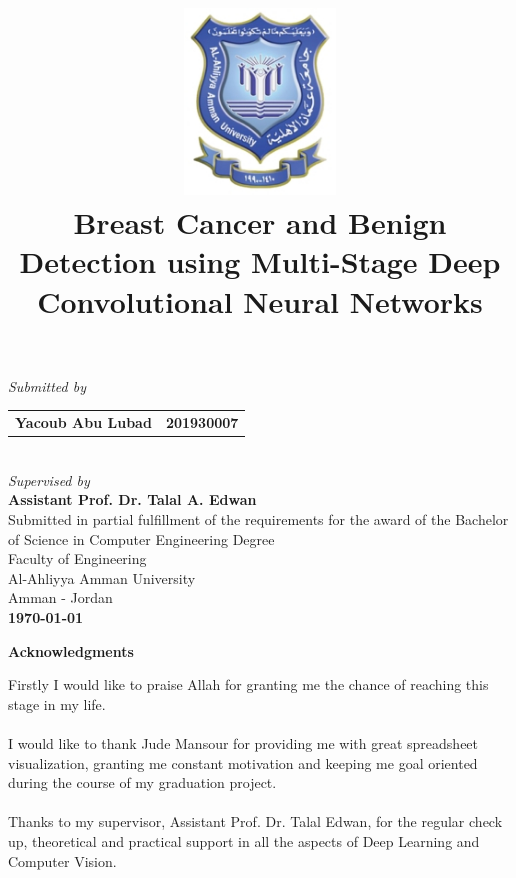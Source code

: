 \documentclass[12pt]{extarticle}
\title{\includegraphics[width=4cm]{pics/AAU_Logo.jpg}\\\Large{\textbf{Breast Cancer and Benign Detection using Multi-Stage Deep Convolutional Neural Networks}}
\date{}}
\begin{document}
	\clearpage\maketitle
	\begin{center}
		\vspace{-1.5cm}
		\large{\emph{Submitted by}}\\\vspace{0.5cm}
		\begin{tabular}{l l}
			
			\multicolumn{1}{p{6cm}}{ \large{\textbf{Yacoub Abu Lubad}}} &  \multicolumn{1}{p{6cm}}{\centering \large{\textbf{201930007}}} 
		\end{tabular}\\\vspace{1cm}
		\large{\emph{Supervised by}}\\\vspace{0.5cm}
		\large{\textbf{Assistant Prof. Dr. Talal A. Edwan}}\\\vspace{1cm}
		{Submitted in partial fulfillment of the requirements for the award of the Bachelor of Science in Computer Engineering Degree\\\vspace{1cm}
		Faculty of Engineering\\Al-Ahliyya Amman University\\Amman - Jordan}\\ \vspace{0.5cm}
		\Large{\textbf{\monthyeardate\today}}
		
		\thispagestyle{empty}
	\end{center}
	\newpage
	\setcounter{page}{1}
	\begin{center}
	\Large{\textbf{Acknowledgments}}\\ \vspace{1cm}
	\end{center}
	Firstly I would like to praise Allah for granting me the chance of reaching this stage in my life.\\\\
	I would like to thank Jude Mansour for providing me with great spreadsheet visualization, granting me constant motivation and keeping me goal oriented during the course of my graduation project.\\\\
	Thanks to my supervisor, Assistant Prof. Dr. Talal Edwan, for the regular check up, theoretical and practical support in all the aspects of Deep Learning and Computer Vision.\\\\
\end{document}

